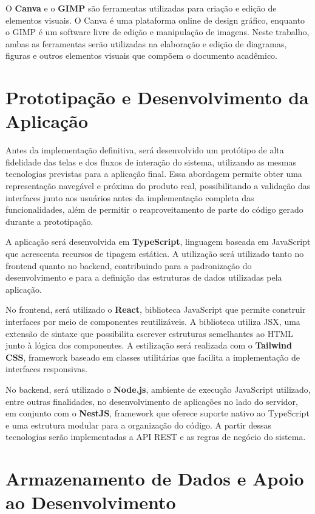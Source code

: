 O \textbf{Canva} e o \textbf{GIMP} são ferramentas utilizadas para criação e edição de elementos visuais. O Canva é uma plataforma online de design gráfico, enquanto o GIMP é um software livre de edição e manipulação de imagens. Neste trabalho, ambas as ferramentas serão utilizadas na elaboração e edição de diagramas, figuras e outros elementos visuais que compõem o documento acadêmico.

\section{Prototipação e Desenvolvimento da Aplicação}

Antes da implementação definitiva, será desenvolvido um protótipo de alta fidelidade das telas e dos fluxos de interação do sistema, utilizando as mesmas tecnologias previstas para a aplicação final. Essa abordagem permite obter uma representação navegável e próxima do produto real, possibilitando a validação das interfaces junto aos usuários antes da implementação completa das funcionalidades, além de permitir o reaproveitamento de parte do código gerado durante a prototipação. 

A aplicação será desenvolvida em \textbf{TypeScript}, linguagem baseada em JavaScript que acrescenta recursos de tipagem estática. A utilização será utilizado tanto no frontend quanto no backend, contribuindo para a padronização do desenvolvimento e para a definição das estruturas de dados utilizadas pela aplicação. 

No frontend, será utilizado o \textbf{React}, biblioteca JavaScript que permite construir interfaces por meio de componentes reutilizáveis. A biblioteca utiliza JSX, uma extensão de sintaxe que possibilita escrever estruturas semelhantes ao HTML junto à lógica dos componentes. A estilização será realizada com o \textbf{Tailwind CSS}, framework baseado em classes utilitárias que facilita a implementação de interfaces responsivas.

No backend, será utilizado o \textbf{Node.js}, ambiente de execução JavaScript utilizado, entre outras finalidades, no desenvolvimento de aplicações no lado do servidor, em conjunto com o \textbf{NestJS}, framework que oferece suporte nativo ao TypeScript e uma estrutura modular para a organização do código. A partir dessas tecnologias serão implementadas a API REST e as regras de negócio do sistema.

\section{Armazenamento de Dados e Apoio ao Desenvolvimento}

